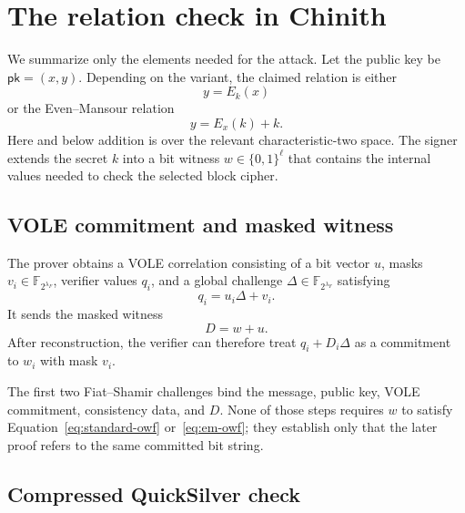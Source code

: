 \documentclass[11pt,a4paper]{article}
\newcommand{\F}{\mathbb{F}}
\newcommand{\pk}{\mathsf{pk}}
\begin{document}
\section{The relation check in Chinith}
\label{sec:scheme}

We summarize only the elements needed for the attack.  Let the public key be
$\pk=(x,y)$.  Depending on the variant, the claimed relation is either
\begin{equation}
                         y=E_k(x)
\label{eq:standard-owf}
\end{equation}
or the Even--Mansour relation
\begin{equation}
                         y=E_x(k)+k.
\label{eq:em-owf}
\end{equation}
Here and below addition is over the relevant characteristic-two space.  The
signer extends the secret $k$ into a bit witness $w\in\{0,1\}^{\ell}$ that
contains the internal values needed to check the selected block cipher.

\subsection{VOLE commitment and masked witness}

The prover obtains a VOLE correlation consisting of a bit vector $u$, masks
$v_i\in\F_{2^{\lambda_F}}$, verifier values $q_i$, and a global challenge
$\Delta\in\F_{2^{\lambda_F}}$ satisfying
\begin{equation}
                         q_i=u_i\Delta+v_i.
\label{eq:vole}
\end{equation}
It sends the masked witness
\begin{equation}
                              D=w+u.
\label{eq:masked-witness}
\end{equation}
After reconstruction, the verifier can therefore treat
$q_i+D_i\Delta$ as a commitment to $w_i$ with mask $v_i$.

The first two Fiat--Shamir challenges bind the message, public key, VOLE
commitment, consistency data, and $D$.  None of those steps requires $w$ to
satisfy Equation~\eqref{eq:standard-owf} or~\eqref{eq:em-owf}; they establish
only that the later proof refers to the same committed bit string.

\subsection{Compressed QuickSilver check}
\end{document}

